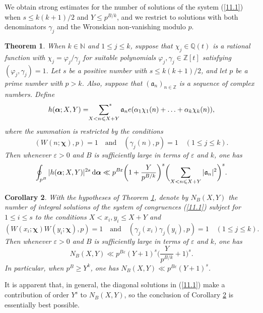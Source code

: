 \documentclass[12pt,reqno]{amsart}
\newtheorem{theorem}{Theorem}[section]
\newtheorem{corollary}[theorem]{Corollary}
\theoremstyle{definition}
\theoremstyle{remark}
\numberwithin{equation}{section}
\def\dbN{{\mathbb N}} \def\dbO{{\mathbb O}} \def\dbP{{\mathbb P}}
\def\dbZ{{\mathbb Z}}\def\dbQ{{\mathbb Q}}
\def\gra{{\mathfrak a}}\def\grA{{\mathfrak A}}\def\bfgra{{\boldsymbol \gra}}
\def\alp{{\alpha}} \def\bfalp{{\boldsymbol \alpha}}
\def\gam{{\gamma}} \def\Gam{{\Gamma}}
\def\bfchi{{\boldsymbol \chi}}
\def\eps{\varepsilon}
\def\le{\leqslant} \def\ge{\geqslant} \def\pleq{\preccurlyeq} \def\ple{\prec}
\def\d{{\,{\rm d}}}
\begin{document}
We obtain strong estimates for the number of solutions of the system (\ref{11.1}) when 
$s\le k(k+1)/2$ and $Y\le p^{B/k}$, and we restrict to solutions with both denominators 
$\gam_j$ and the Wronskian non-vanishing modulo $p$.\par

\begin{theorem}\label{theorem11.1} When $k\in \dbN$ and $1\le j\le k$, suppose that 
$\chi_j\in \dbQ(t)$ is a rational function with $\chi_j=\varphi_j/\gam_j$ for suitable 
polynomials $\varphi_j,\gam_j\in \dbZ[t]$ satisfying $(\varphi_j,\gam_j)=1$. Let $s$ be 
a positive number with $s\le k(k+1)/2$, and let $p$ be a prime number with $p>k$. Also, 
suppose that $(\gra_n)_{n\in \dbZ}$ is a sequence of complex numbers. Define
$$h(\bfalp;X,Y)=\sideset{}{^*}\sum_{X<n\le X+Y}\gra_ne(\alp_1\chi_1(n)+\ldots 
+\alp_k\chi_k(n)),$$
where the summation is restricted by the conditions
\begin{equation}\label{11.2}
(W(n;\bfchi),p)=1\quad \text{and}\quad (\gam_j(n),p)=1\quad (1\le j\le k).
\end{equation}
Then whenever $\eps>0$ and $B$ is sufficiently large in terms of $\eps$ and $k$, one has
\begin{equation}\label{11.3}
\oint_{p^B}|h(\bfalp;X,Y)|^{2s}\d\bfalp \ll p^{B\eps}\biggl(1+\frac{Y}{p^{B/k}}\biggr)^s
\biggl( \sum_{X<n\le X+Y}|\gra_n|^2\biggr)^s.
\end{equation}
\end{theorem}

\begin{corollary}\label{corollary11.2} With the hypotheses of Theorem \ref{theorem11.1}, 
denote by $N_B(X,Y)$ the number of integral solutions of the system of congruences 
(\ref{11.1}) subject for $1\le i\le s$ to the conditions $X<x_i,y_i\le X+Y$ and
$$(W(x_i;\bfchi)W(y_i;\bfchi),p)=1\quad \text{and}\quad (\gam_j(x_i)\gam_j(y_i),p)=1
\quad (1\le j\le k).$$
Then whenever $\eps>0$ and $B$ is sufficiently large in terms of $\eps$ and $k$, one has
$$N_B(X,Y)\ll p^{B\eps}(Y+1)^s\biggl(\frac{Y}{p^{B/k}}+1\biggr)^s.$$
In particular, when $p^B\ge Y^k$, one has $N_B(X,Y)\ll p^{B\eps}(Y+1)^s$.
\end{corollary}

It is apparent that, in general, the diagonal solutions in (\ref{11.1}) make a contribution of 
order $Y^s$ to $N_B(X,Y)$, so the conclusion of Corollary \ref{corollary11.2} is essentially 
best possible.
\end{document}
